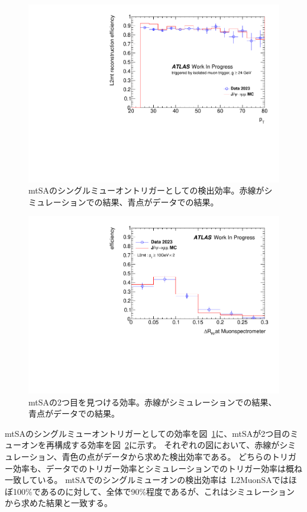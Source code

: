 \begin{figure}[h]
    \centering
    \includegraphics[clip, width=12cm]{fig/4/L2mt_singlemuon_eff.pdf}
    \caption{mtSAのシングルミューオントリガーとしての検出効率。赤線がシミュレーションでの結果、青点がデータでの結果。}
    \label{fig:L2mtSingleEff}
\end{figure}

\begin{figure}[h]
    \centering
    \includegraphics[clip, width=12cm]{fig/4/L2mt_eff_ext_deltaR.pdf}
    \caption{mtSAの2つ目を見つける効率。赤線がシミュレーションでの結果、青点がデータでの結果。}
    \label{fig:L2mt2muonEff}
\end{figure}

mtSAのシングルミューオントリガーとしての効率を図~\ref{fig:L2mtSingleEff}に、mtSAが2つ目のミューオンを再構成する効率を図~\ref{fig:L2mt2muonEff}に示す。
それぞれの図において、赤線がシミュレーション、青色の点がデータから求めた検出効率である。
どちらのトリガー効率も、データでのトリガー効率とシミュレーションでのトリガー効率は概ね一致している。
mtSAでのシングルミューオンの検出効率は~L2MuonSAではほぼ100$\%$であるのに対して、全体で90$\%$程度であるが、これはシミュレーションから求めた結果と一致する。

